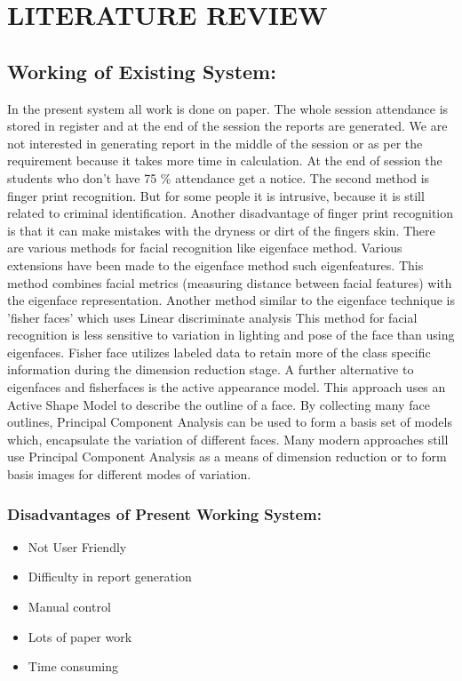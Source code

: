 \chapter{LITERATURE REVIEW }

\section{Working of Existing System: }
In the present system all work is done on paper. The whole session attendance is stored in register and at the end of the session the reports are generated. We are not interested in generating report in the middle of the session or as per the requirement because it takes more time in calculation. At the end of session the students who don’t have 75 \% attendance get a notice. The second method is finger print recognition. But for some people it is intrusive, because it is still related to criminal identification. Another disadvantage of finger print recognition is that it can make mistakes with the dryness or dirt of the fingers skin. There are various methods for facial recognition like eigenface method. Various extensions have been made to the eigenface method such eigenfeatures.\cite{sups} This method combines facial metrics (measuring distance between facial features) with the eigenface representation. Another method similar to the eigenface technique is 'fisher faces' which uses Linear discriminate analysis This method for facial recognition is less sensitive to variation in lighting and pose of the face than using eigenfaces. Fisher face utilizes labeled data to retain more of the class specific information during the dimension reduction stage. A further alternative to eigenfaces and fisherfaces is the active appearance model. This approach uses an Active Shape Model to describe the outline of a face. By collecting many face outlines, Principal Component Analysis can be used to form a basis set of models which, encapsulate the variation of different faces. Many modern approaches still use Principal Component Analysis as a means of dimension reduction or to form basis images for different modes of variation.\cite{pdya}

\newpage
\subsection{Disadvantages of Present Working System: }
\begin{itemize}
 \item       Not User Friendly 
 \item       Difficulty in report generation 
 \item        Manual control
 \item        Lots of paper work 
 \item        Time consuming 
\end{itemize}
        
